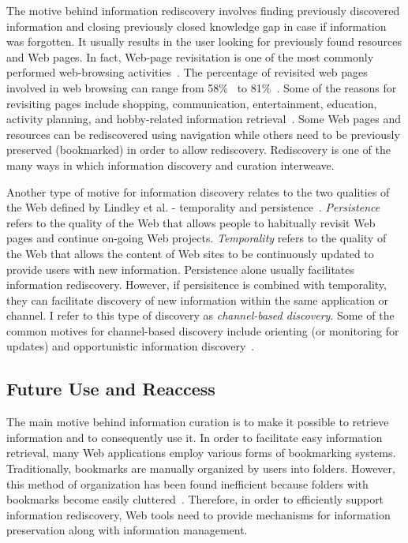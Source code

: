 {{The motive behind information rediscovery involves finding previously discovered information and closing previously closed knowledge gap in case if information was forgotten. It usually results in the user looking for previously found resources and Web pages. In fact, Web-page revisitation is one of the most commonly performed web-browsing activities~\cite{adar2008large,cockburn2003improving}. The percentage of revisited web pages involved in web browsing can range from 58\%~\cite{tauscher1997people} to 81\%~\cite{cockburn2001web}. Some of the reasons for revisiting pages include shopping, communication, entertainment, education, activity planning, and hobby-related information retrieval~\cite{adar2008large}. Some Web pages and resources can be rediscovered using navigation while others need to be previously preserved (bookmarked) in order to allow rediscovery. Rediscovery is one of the many ways in which information discovery and curation interweave. 

Another type of motive for information discovery relates to the two qualities of the Web defined by Lindley et al. - temporality and persistence~\citep{lindley2012s}. \textit{Persistence} refers to the quality of the Web that allows people to habitually revisit Web pages and continue on-going Web projects. \textit{Temporality} refers to the quality of the Web that allows the content of Web sites to be continuously updated to provide users with new information. Persistence alone usually facilitates information rediscovery. However, if persisitence is combined with temporality, they can facilitate discovery of new information within the same application or channel. I refer to this type of discovery as \textit{channel-based discovery}. Some of the common motives for channel-based discovery include orienting (or monitoring for updates) and opportunistic information discovery~\citep{lindley2012s}.          
}

{\subsection{Future Use and Reaccess}
The main motive behind information curation is to make it possible to retrieve information and to consequently use it. In order to facilitate easy information retrieval, many Web applications employ various forms of bookmarking systems. Traditionally, bookmarks are manually organized by users into folders. However, this method of organization has been found inefficient because folders with bookmarks become easily cluttered~\cite{abrams1998information}. Therefore, in order to efficiently support information rediscovery, Web tools need to provide mechanisms for information preservation along with information management.
}

}
